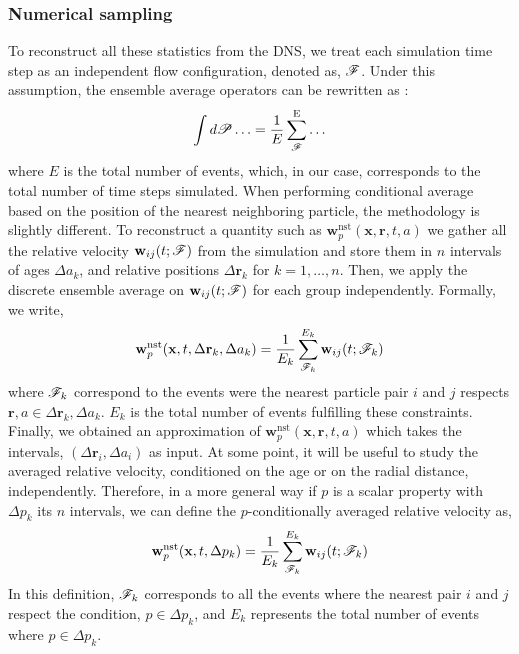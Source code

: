 \subsubsection*{Numerical sampling}

To reconstruct all these statistics from the DNS, we treat each simulation time step  as an independent flow configuration, denoted as, $\mathscr{F}$. 
Under this assumption, the ensemble average operators can be rewritten as :
\begin{equation}
    \int  d\mathscr{P}\ldots
    = \frac{1}{E}\sum_{\mathscr{F}}^\text{E} \ldots 
    \label{eq:discrete_ensemble_average}
\end{equation}
where $E$ is the total number of events, which, in our case, corresponds to the total number of time steps simulated.  
When performing conditional average based on the position of the nearest neighboring particle, the methodology is slightly different. 
To reconstruct a quantity such as $\textbf{w}^\text{nst}_p(\textbf{x},\textbf{r},t,a)$ we gather all the relative velocity $\textbf{w}_{ij}(t;\mathscr{F})$ from the simulation and store them in $n$ intervals of ages $\Delta a_k$, and relative positions $\Delta \textbf{r}_k$ for $k = 1,\ldots, n$.
Then, we apply the discrete ensemble average on $\textbf{w}_{ij}(t;\mathscr{F})$ for each group independently.
Formally, we write, 
\begin{equation}
    \textbf{w}^\text{nst}_p(\textbf{x},t,\Delta\textbf{r}_k,\Delta a_k)
    = \frac{1}{E_k} 
    \sum^{E_k}_{\mathscr{F}_k} 
    \textbf{w}_{ij}(t;\mathscr{F}_k)
    \label{eq:vec_cond}
\end{equation}
where $\mathscr{F}_k$ correspond to the events were the nearest particle pair $i$ and $j$ respects $\textbf{r},a \in \Delta \textbf{r}_k ,\Delta a_k$.
$E_k$ is the total number of events fulfilling these constraints. 
Finally, we obtained an approximation of $\textbf{w}^\text{nst}_p(\textbf{x},\textbf{r},t,a)$ which takes the intervals, $(\Delta\textbf{r}_i,\Delta a_i)$ as input.
At some point, it will be useful to study the averaged relative velocity, conditioned on the age or on the radial distance, independently. 
Therefore, in a more general way if $p$ is a scalar property with $\Delta p_k$ its $n$ intervals, we can define the $p$-conditionally averaged relative velocity as, 
\begin{equation}
    \textbf{w}^\text{nst}_p(\textbf{x},t,\Delta p_k)
    = \frac{1}{E_{k}} 
    \sum^{E_{k}}_{\mathscr{F}_{k}}  
    \textbf{w}_{ij}(t;\mathscr{F}_k)
    \label{eq:scalar_cond}
\end{equation}
In this definition, $\mathscr{F}_{k}$ corresponds to all the events where the nearest pair $i$ and $j$ respect the condition, $p \in \Delta p_k$, and $E_{k}$ represents the total number of events where $p\in\Delta p_k$. 

